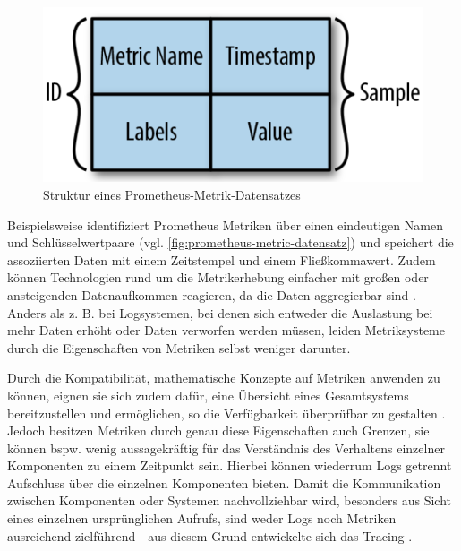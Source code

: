 \begin{figure}
\centering
\includegraphics[width=\linewidth]{img/03_methoden/prometheus-metric-sample.png}
\caption{Struktur eines Prometheus-Metrik-Datensatzes \cite{DistributedSystemsObservability}}
\label{fig:prometheus-metric-datensatz}
\end{figure}

Beispielsweise identifiziert Prometheus \cite{Prometheus} Metriken über einen eindeutigen Namen und Schlüsselwertpaare (vgl. \autoref{fig:prometheus-metric-datensatz}) und speichert die assoziierten Daten mit einem Zeitstempel und einem Fließkommawert. Zudem können Technologien rund um die Metrikerhebung einfacher mit großen oder ansteigenden Datenaufkommen reagieren, da die Daten aggregierbar sind \cite{DistributedSystemsObservability}. Anders als z. B. bei Logsystemen, bei denen sich entweder die Auslastung bei mehr Daten erhöht oder Daten verworfen werden müssen, leiden Metriksysteme durch die Eigenschaften von Metriken selbst weniger darunter.

Durch die Kompatibilität, mathematische Konzepte auf Metriken anwenden zu können, eignen sie sich zudem dafür, eine Übersicht eines Gesamtsystems bereitzustellen und ermöglichen, so die Verfügbarkeit überprüfbar zu gestalten \cite{MultilevelObservabilityInCloudOrchestration} \cite{DistributedSystemsObservability}. Jedoch besitzen Metriken durch genau diese Eigenschaften auch Grenzen, sie können bspw. wenig aussagekräftig für das Verständnis des Verhaltens einzelner Komponenten zu einem Zeitpunkt sein. Hierbei können wiederrum Logs getrennt Aufschluss über die einzelnen Komponenten bieten. Damit die Kommunikation zwischen Komponenten oder Systemen nachvollziehbar wird, besonders aus Sicht eines einzelnen ursprünglichen Aufrufs, sind weder Logs noch Metriken ausreichend zielführend - aus diesem Grund entwickelte sich das Tracing \cite{MultilevelObservabilityInCloudOrchestration} \cite{DistributedSystemsObservability}.

